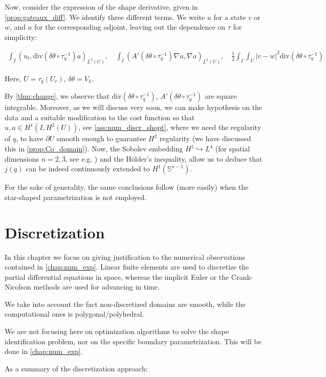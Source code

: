 \documentclass[english,a4paper,9pt,oneside]{scrbook}	%
\theoremstyle{break}
\theoremstyle{remark}
\newcommand{\mS}{\mathbb{S}^{n-1}}
\newcommand{\emb}{\hookrightarrow}
\newcommand{\te}{\theta}
\newcommand{\dive}{\text{div}}
\begin{document}
Now, consider the expression of the shape derivative, given in \cref{prop:gateaux_diff}. We identify three different terms. We write $u$ for a state $v$ or $w$, and $a$ for the corresponding adjoint, leaving out the dependence on $\tau$ for simplicity:

\begin{align*}
\int_I (u_t , \dive(\delta \te \circ \tau_q^{-1}) a)_{L^2(U)}, \quad \int_I (A'(\delta\te\circ \tau_q^{-1} )\nabla u, \nabla a)_{L^2(U)}, \quad \frac{1}{2}\int_I\int_{U} |v-w|^2\dive(\delta \te\circ \tau_q^{-1})
\end{align*}

Here, $U = \tau_q(U_r)$, $\delta \te = V_h$.

By \cref{thm:change}, we observe that $\dive(\delta \te\circ \tau_q^{-1})$, $A'(\delta\te\circ \tau_q^{-1} )$ are square integrable. Moreover, as we will discuss very soon, we can make hypothesis on the data and a suitable modification to the cost function so that $u, a \in H^1(I, H^2(U))$, see \cref{ass:num_discr_shopt}, where we need the regularity of $q$, to have $\partial U$ smooth enough to guarantee $H^2$ regularity (we have discussed this in \cref{prop:Co_domain}). Now, the Sobolev embedding $H^1\emb L^4$ (for spatial dimensions $n=2,3$, see e.g. \cite{adams}) and the Hölder's inequality, allow us to deduce that $j(q)$ can be indeed continuously extended to $H^1(\mS)$. 

For the sake of generality, the same conclusions follow (more easily) when the star-shaped parametrization is not employed.


\chapter{Discretization}
\label{chap:discretization}
In this chapter we focus on giving justification to the numerical observations contained in \cref{chap:num_exp}. Linear finite elements are used to discretize the partial differential equations in space, whereas the implicit Euler or the Crank-Nicolson methods are used for advancing in time.

We take into account the fact non-discretized domains are smooth, while the computational ones is polygonal/polyhedral. 

We are not focusing here on optimization algorithms to solve the shape identification problem, nor on the specific boundary parametrization. This will be done in \cref{chap:num_exp}.


As a summary of the discretization approach:
\end{document}

